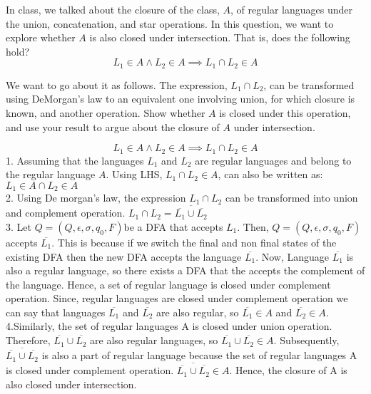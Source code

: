 \documentclass[addpoints]{exam}
\begin{document}
\begin{questions}
\begin{parts}
\begin{solution}
  
  
  \end{solution}
  \end{parts}

\question[5] In class, we talked about the closure of the class, $A$, of regular languages under the union, concatenation, and star operations. In this question, we want to explore whether $A$ is also closed under intersection. That is, does the following hold?
  \[
    L_1\in A \land L_2\in A \implies L_1 \cap L_2\in A
  \]

  We want to go about it as follows. The expression, $L_1 \cap L_2$, can be transformed using DeMorgan's law to an equivalent one involving union, for which closure is known, and another operation. Show whether $A$ is closed under this operation, and use your result to argue about the closure of $A$ under intersection.
  \begin{solution}
 \[ L_1\in A \land L_2\in A \implies L_1 \cap L_2\in A \]
  1. Assuming that the languages $L_1$ and $L_2$ are regular languages and belong to the regular language $A$.
  Using LHS,
  $L_1 \cap L_2\in A$, can also be written as: $L_1 \in A \cap L_2\in A$
 \\
  2. Using De morgan's law, the expression $L_1 \cap L_2$ can be transformed into union and complement operation. 
  $L_1 \cap L_2 = \overline{\overline{L_1}\cup  \overline{L_2}} $
  \\
  3. Let $Q = (Q,\epsilon,\sigma, q_0,F)$be a DFA that accepts $L_1$. Then, $Q =(Q,\epsilon,\sigma,q_0,F)$ accepts $\overline{L_1}$. This is because if we switch the final and non final states of the existing DFA then the new DFA accepts the language $\overline{L_1}$. Now, Language $\overline{L_1}$ is also a regular language, so there exists a DFA that the accepts the complement of the language. Hence, a set of regular language is closed under complement operation. Since, regular languages are closed under complement operation we can say that languages $\overline{L_1}$ and  $\overline{L_2}$ are also regular, so $\overline{L_1} \in A$ and $\overline{L_2} \in A$.
  \\
  4.Similarly, the set of regular languages A is closed under union operation. Therefore, ${\overline{L_1}\cup  \overline{L_2}} $ are also regular languages, so  ${\overline{L_1}\cup  \overline{L_2}} \in A $. Subsequently, $\overline{\overline{L_1}\cup  \overline{L_2}} $ is also a part of regular language because the set of regular languages A is closed under complement operation. $\overline{\overline{L_1}\cup  \overline{L_2}}\in A $. Hence, the closure of A is also closed under intersection.
  \\


\end{solution}
\end{questions}
\end{document}
